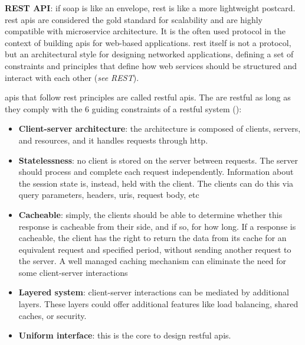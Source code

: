 \begin{multicols}{2}
      \textbf{REST API}: if \acrshort{soap} is like an envelope, \acrshort{rest} is like a  more lightweight postcard.
      \acrshort{rest} \acrshort{api}s are considered the gold standard for scalability and are highly compatible with
      microservice architecture. It is the often used protocol in the context of building \acrshort{api}s for web-based
      applications. \acrshort{rest} itself is not a protocol, but an architectural style for designing networked
      applications, defining a set of constraints and principles that define how web services should be structured
      and interact with each other (\textit{see \gls{REST}}).

      \acrshort{api}s that follow \acrshort{rest} principles are called \acrshort{rest}ful \acrshort{api}s. The
      are \acrshort{rest}ful as long as they comply with the 6 guiding constraints of a \acrshort{rest}ful system
      (\cite{restguidingprinciples}):
      \begin{itemize}
            \item \textbf{Client-server architecture}: the architecture is composed of clients, servers, and
                  resources, and it handles requests through \acrshort{http}.
            \item \textbf{Statelessness}: no client is stored on the server between requests. The server should
                  process and complete each request independently. Information about the session state is, instead,
                  held with the client. The clients can do this via query parameters, headers, \acrshort{uri}s,
                  request body, \acrshort{etc}
            \item \textbf{Cacheable}: simply, the clients should be able to determine whether this response is cacheable
                  from their side, and if so, for how long. If a response is cacheable, the client has the right to return the
                  data from its cache for an equivalent request and specified period, without sending another request to the
                  server. A well managed caching mechanism can eliminate the need for some client-server interactions
            \item \textbf{Layered system}: client-server interactions can be mediated by additional layers. These
                  layers could offer additional features like load balancing, shared caches, or security.
            \item \textbf{Uniform interface}: this is the core to design \acrshort{rest}ful \acrshort{api}s.

\end{itemize}
\end{multicols}
